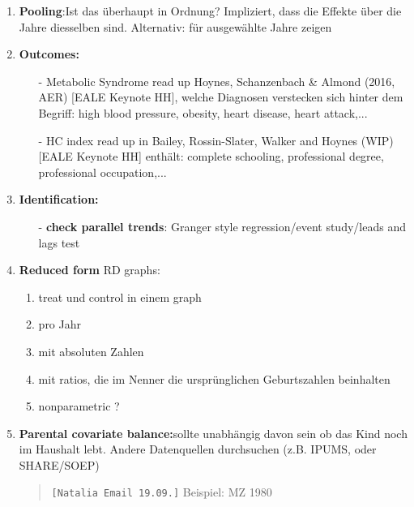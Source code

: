 \documentclass[11pt,a4paper]{article}
\begin{document}
\begin{enumerate}

\item \textbf{Pooling}:\newline Ist das  überhaupt in Ordnung? Impliziert, dass die Effekte über die Jahre diesselben sind. Alternativ: für ausgewählte	Jahre zeigen


\item \textbf{Outcomes: }\vspace{-1em}
\begin{itemize}
\item[-]Metabolic Syndrome \newline read up Hoynes, Schanzenbach \& Almond (2016, AER) [EALE Keynote HH], welche Diagnosen verstecken sich hinter dem Begriff: high blood pressure, obesity, heart disease, heart attack,...
\item[-] HC index \newline read up in Bailey, Rossin-Slater, Walker and Hoynes (WIP) [EALE Keynote HH] enthält: complete schooling, professional degree, professional occupation,...
\end{itemize}



\item \textbf{Identification:}\vspace{-1em}
\begin{itemize}
\item[-]\textbf{check parallel trends}: Granger style regression/event study/leads and lags test
\end{itemize}


\item \textbf{Reduced form}\newline 
RD graphs:\vspace{-1em}
\begin{enumerate}
\item treat und control in einem graph
\item pro Jahr
\item mit absoluten Zahlen
\item mit ratios, die im Nenner die ursprünglichen Geburtszahlen beinhalten
\item nonparametric ? 
\end{enumerate}
\item \textbf{Parental covariate balance:}\newline sollte unabhängig davon sein ob das Kind noch im Haushalt lebt. Andere Datenquellen durchsuchen (z.B. IPUMS, oder SHARE/SOEP)
\begin{quote}
\texttt{[Natalia Email 19.09.]}\newline
Beispiel: MZ 1980 


\end{quote}
\end{enumerate}
\end{document}
